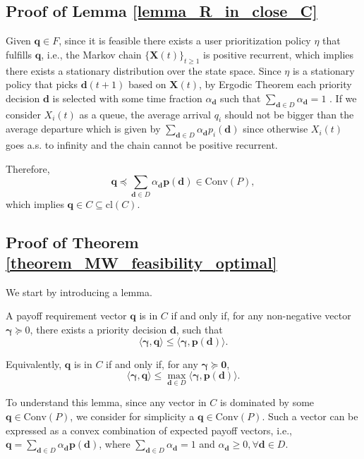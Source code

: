 \documentclass[prodmode,acmtompecs]{acmsmall}
\newcommand{\reqvec}{\mathbf{q}}
\newcommand{\reqscalar}{q}
\newcommand{\feasibilityRegion}{F}
\begin{document}
\subsection{Proof of Lemma \ref{lemma_R_in_close_C}}
\label{appendix_pf_lemma_F_in_close_C}
Given $\reqvec \in \feasibilityRegion$, since it is feasible there exists a user prioritization policy $\eta$ that fulfills $\reqvec$, i.e., the Markov chain $\{\mathbf{X}(t)\}_{t\geq 1}$ is positive recurrent, which implies there exists a stationary distribution over the state space. Since $\eta$ is a stationary policy that picks $\mathbf{d}(t+1)$ based on $\mathbf{X}(t)$, by Ergodic Theorem each priority decision $\mathbf{d}$ is selected with some time fraction $\alpha_\mathbf{d}$ such that $\sum\limits_{\mathbf{d} \in D}\alpha_\mathbf{d} = 1$ . If we consider $X_i(t)$ as a queue, the average arrival $\reqscalar_i$  should not be bigger than the average departure which is given by $\sum\limits_{\mathbf{d}\in D} \alpha_\mathbf{d} p_i(\mathbf{d})$ since otherwise $X_i(t)$ goes a.s. to infinity and the chain cannot be positive recurrent. 

Therefore, 
$$
\reqvec \preceq \sum\limits_{\mathbf{d}\in D} \alpha_\mathbf{d} \mathbf{p}(\mathbf{d}) \in \text{Conv}(P), 
$$
which implies $\reqvec \in C \subseteq \text{cl}(C)$. 

\subsection{Proof of Theorem \ref{theorem_MW_feasibility_optimal}}
\label{appendix_pf_thm_MW_feasibility_optimal}
We start by introducing a lemma. 

\begin{lemma}
\label{lemma_feasibility_region_projection_understanding}
A payoff requirement vector $\reqvec$ is in $C$ if and only if, for any non-negative vector $\boldsymbol{\gamma} \succeq 0$, there exists a priority decision $\mathbf{d}$, such that
$$
\langle \boldsymbol{\gamma}, \reqvec \rangle \leq \langle \boldsymbol{\gamma}, \mathbf{p}(\mathbf{d}) \rangle. 
$$

Equivalently, $\reqvec$ is in $C$ if and only if, for any $\boldsymbol{\gamma} \succeq \mathbf{0}$, 
$$
\langle \boldsymbol{\gamma}, \reqvec \rangle \leq \max\limits_{\mathbf{d} \in D} \langle \boldsymbol{\gamma}, \mathbf{p}(\mathbf{d}) \rangle. 
$$
\end{lemma}

To understand this lemma, since any vector in $C$ is dominated by some $\reqvec \in \text{Conv}(P)$, we consider for simplicity a $\reqvec \in \text{Conv}(P)$. Such a vector can be expressed as a convex combination of expected payoff vectors, i.e., $\reqvec = \sum\limits_{\mathbf{d} \in D} \alpha_{\mathbf{d}} \mathbf{p}(\mathbf{d})$, where 
$\sum\limits_{\mathbf{d} \in D} \alpha_{\mathbf{d}} = 1 $ and 
$\alpha_{\mathbf{d}} \geq 0, \forall \mathbf{d} \in D. $
\end{document}
